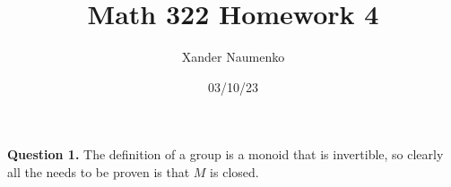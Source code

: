 \documentclass[letterpaper, reqno,11pt]{article}
\begin{document}
\title{Math 322 Homework 4}
\date{03/10/23}
\author{Xander Naumenko}
\maketitle

{\medskip\noindent\bf Question 1.} The definition of a group is a monoid that is invertible, so clearly all the needs to be proven is that $M$ is closed. 
\end{document}
